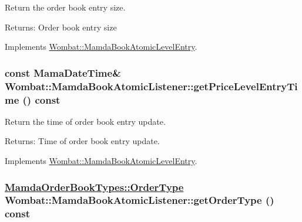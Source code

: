 Return the order book entry size. 

\begin{Desc}
\item[Returns:]Order book entry size \end{Desc}


Implements \hyperlink{classWombat_1_1MamdaBookAtomicLevelEntry_1c086ffcdec385808fc04a111eddf1d0}{Wombat::Mamda\-Book\-Atomic\-Level\-Entry}.\hypertarget{classWombat_1_1MamdaBookAtomicListener_fa4686145cc28c1225b9e546399c4ff4}{
\subsubsection[getPriceLevelEntryTime]{\setlength{\rightskip}{0pt plus 5cm}const Mama\-Date\-Time\& Wombat::Mamda\-Book\-Atomic\-Listener::get\-Price\-Level\-Entry\-Time () const}}
\label{classWombat_1_1MamdaBookAtomicListener_fa4686145cc28c1225b9e546399c4ff4}


Return the time of order book entry update. 

\begin{Desc}
\item[Returns:]Time of order book entry update. \end{Desc}


Implements \hyperlink{classWombat_1_1MamdaBookAtomicLevelEntry_dec1931e3377c2f62bfee4900e51ce8a}{Wombat::Mamda\-Book\-Atomic\-Level\-Entry}.\hypertarget{classWombat_1_1MamdaBookAtomicListener_0c3b1f7657aed8bba468e8500dded596}{
\subsubsection[getOrderType]{\setlength{\rightskip}{0pt plus 5cm}\hyperlink{classWombat_1_1MamdaOrderBookTypes_b1b75d93c83c5a1042c392ab46a27291}{Mamda\-Order\-Book\-Types::Order\-Type} Wombat::Mamda\-Book\-Atomic\-Listener::get\-Order\-Type () const}}
\label{classWombat_1_1MamdaBookAtomicListener_0c3b1f7657aed8bba468e8500dded596}


